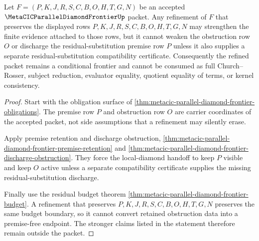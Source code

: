 \begin{theorem}
\label{thm:metacic-parallel-diamond-frontier-obstruction-monotonicity}
Let $F=(P,K,J,R,S,C,B,O,H,T,G,N)$ be an accepted $\MetaCICParallelDiamondFrontierUp$ packet. Any refinement of $F$ that preserves the displayed rows $P,K,J,R,S,C,B,O,H,T,G,N$ may strengthen the finite evidence attached to those rows, but it cannot weaken the obstruction row $O$ or discharge the residual-substitution premise row $P$ unless it also supplies a separate residual-substitution compatibility certificate. Consequently the refined packet remains a conditional frontier and cannot be consumed as full Church--Rosser, subject reduction, evaluator equality, quotient equality of terms, or kernel consistency.
\end{theorem}
\begin{proof}
Start with the obligation surface of \autoref{thm:metacic-parallel-diamond-frontier-obligations}. The premise row $P$ and obstruction row $O$ are carrier coordinates of the accepted packet, not side assumptions that a refinement may silently erase.

Apply premise retention and discharge obstruction, \autoref{thm:metacic-parallel-diamond-frontier-premise-retention} and \autoref{thm:metacic-parallel-diamond-frontier-discharge-obstruction}. They force the local-diamond handoff to keep $P$ visible and keep $O$ active unless a separate compatibility certificate supplies the missing residual-substitution discharge.

Finally use the residual budget theorem \autoref{thm:metacic-parallel-diamond-frontier-budget}. A refinement that preserves $P,K,J,R,S,C,B,O,H,T,G,N$ preserves the same budget boundary, so it cannot convert retained obstruction data into a premise-free endpoint. The stronger claims listed in the statement therefore remain outside the packet.
\end{proof}

